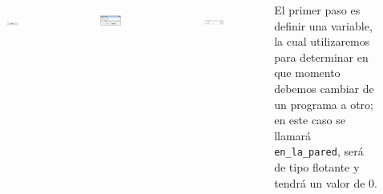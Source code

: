\begin{frame}
	\begin{columns}
		\begin{figure}
			\begin{center}
				\includegraphics[width=0.9\textwidth]{images/00-control-multiple/03-01.png}
				\label{fig:multiple-03-01}
			\end{center}
		\end{figure}
		\begin{figure}
			\begin{center}
				\includegraphics[width=0.9\textwidth]{images/00-control-multiple/04.png}
				\label{fig:multiple-04}
			\end{center}
		\end{figure}
		\begin{figure}
			\begin{center}
				\includegraphics[width=0.9\textwidth]{images/00-control-multiple/03-02.png}
				\label{fig:multiple-03-02}
			\end{center}
		\end{figure}

		El primer paso es definir una variable, la cual utilizaremos para determinar en que momento debemos cambiar de un programa a otro; en este caso se llamará \texttt{en\_la\_pared}, será de tipo flotante y tendrá un valor de 0.
	\end{columns}
\end{frame}


